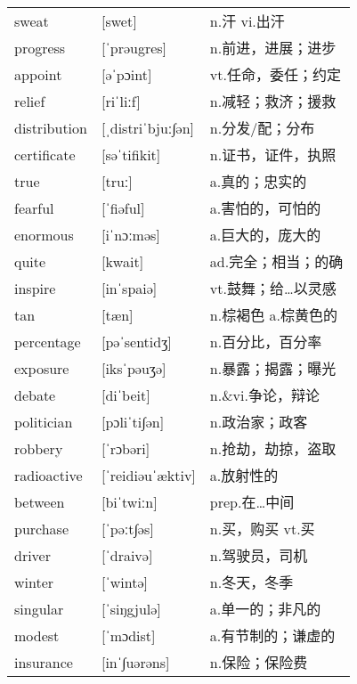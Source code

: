 \documentclass[a4paper]{article}
\begin{document}
\section{}
\begin{tabular}{l l l}

sweat & [swet] & n.汗 vi.出汗 \\
progress & [ˈprəugres] & n.前进，进展；进步 \\
appoint & [əˈpɔint] & vt.任命，委任；约定 \\
relief & [riˈliːf] & n.减轻；救济；援救 \\
distribution & [ˌdistriˈbjuː∫ən] & n.分发/配；分布 \\
certificate & [səˈtifikit] & n.证书，证件，执照 \\
true & [truː] & a.真的；忠实的 \\
fearful & [ˈfiəful] & a.害怕的，可怕的 \\
enormous & [iˈnɔːməs] & a.巨大的，庞大的 \\
quite & [kwait] & ad.完全；相当；的确 \\
inspire & [inˈspaiə] & vt.鼓舞；给…以灵感 \\
tan & [tæn] & n.棕褐色 a.棕黄色的 \\
percentage & [pəˈsentidʒ] & n.百分比，百分率 \\
exposure & [iksˈpəuʒə] & n.暴露；揭露；曝光 \\
debate & [diˈbeit] & n.\&vi.争论，辩论 \\
politician & [pɔliˈti∫ən] & n.政治家；政客 \\
robbery & [ˈrɔbəri] & n.抢劫，劫掠，盗取 \\
radioactive & [ˈreidiəuˈæktiv] & a.放射性的 \\
between & [biˈtwiːn] & prep.在…中间 \\
purchase & [ˈpəːt∫əs] & n.买，购买 vt.买 \\
driver & [ˈdraivə] & n.驾驶员，司机 \\
winter & [ˈwintə] & n.冬天，冬季 \\
singular & [ˈsiŋgjulə] & a.单一的；非凡的 \\
modest & [ˈmɔdist] & a.有节制的；谦虚的 \\
insurance & [inˈ∫uərəns] & n.保险；保险费 \\

\end{tabular}
\end{document}
